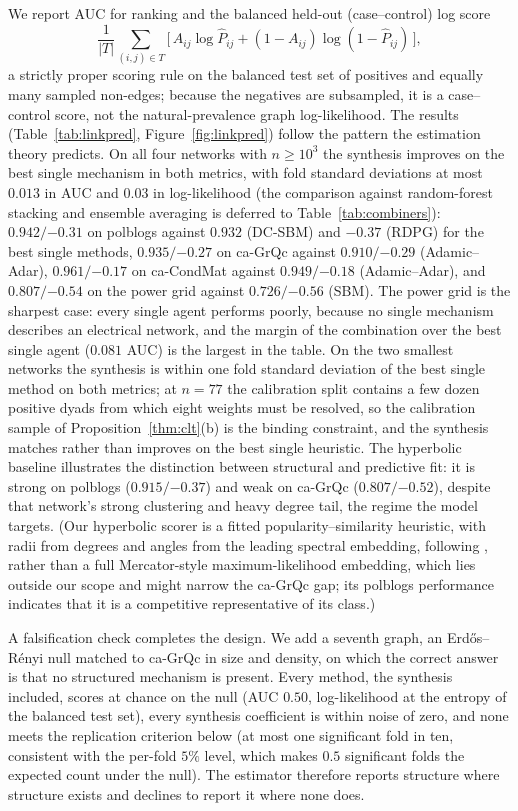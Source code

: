 \documentclass[12pt]{article}
\newcommand{\1}{\mathbf{1}}
\begin{document}
We report AUC for ranking and the balanced held-out (case--control) log score
\[
\frac1{|T|}\sum_{(i,j)\in T}\bigl[\,A_{ij}\log\hat P_{ij}+(1-A_{ij})\log(1-\hat P_{ij})\,\bigr],
\]
a strictly proper scoring rule on the balanced test set of positives and equally many sampled non-edges; because the negatives are subsampled, it is a case--control score, not the natural-prevalence graph log-likelihood. The results (Table~\ref{tab:linkpred}, Figure~\ref{fig:linkpred}) follow the
pattern the estimation theory predicts. On all four networks with $n\ge10^3$ the synthesis improves on the best single mechanism in both
metrics, with fold standard deviations at most $0.013$ in AUC and $0.03$ in log-likelihood (the
comparison against random-forest stacking and ensemble averaging is
deferred to Table~\ref{tab:combiners}): $0.942/{-0.31}$ on \textsf{polblogs} against $0.932$ (DC-SBM) and $-0.37$ (RDPG) for
the best single methods, $0.935/{-0.27}$ on \textsf{ca-GrQc} against $0.910/{-0.29}$ (Adamic--Adar),
$0.961/{-0.17}$ on \textsf{ca-CondMat} against $0.949/{-0.18}$ (Adamic--Adar), and $0.807/{-0.54}$
on the \textsf{power} grid against $0.726/{-0.56}$ (SBM). The power grid is the sharpest case: every
single agent performs poorly, because no single mechanism describes an electrical network, and the
margin of the combination over the best single agent ($0.081$ AUC) is the largest in the table. On
the two smallest networks the synthesis is within one fold standard deviation of the best single
method on both metrics; at $n=77$ the calibration split contains a few dozen positive dyads from
which eight weights must be resolved, so the calibration sample of Proposition~\ref{thm:clt}(b) is the
binding constraint, and the synthesis matches rather than improves on the best single
heuristic. The hyperbolic baseline illustrates the distinction between structural and predictive
fit: it is strong on \textsf{polblogs} ($0.915/{-0.37}$) and weak on \textsf{ca-GrQc}
($0.807/{-0.52}$), despite that network's strong clustering and heavy degree tail, the regime the
model targets. (Our hyperbolic scorer is a fitted popularity--similarity heuristic,
with radii from degrees and angles from the leading spectral embedding, following
\citealp{papadopoulos2014network}, rather than a full Mercator-style maximum-likelihood embedding, which
lies outside our scope and might narrow the \textsf{ca-GrQc} gap; its \textsf{polblogs} performance
indicates that it is a competitive representative of its class.)

A falsification check completes the design. We add a seventh graph, an Erd\H{o}s--R\'enyi null
matched to \textsf{ca-GrQc} in size and density, on which the correct answer is that no structured
mechanism is present. Every method, the synthesis included, scores at chance on the null (AUC
$0.50$, log-likelihood at the entropy of the balanced test set), every synthesis coefficient is
within noise of zero, and none meets the replication criterion below (at most one significant fold
in ten, consistent with the per-fold $5\%$ level, which makes $0.5$ significant folds the expected
count under the null). The estimator therefore reports structure where structure
exists and declines to report it where none does.
\end{document}
